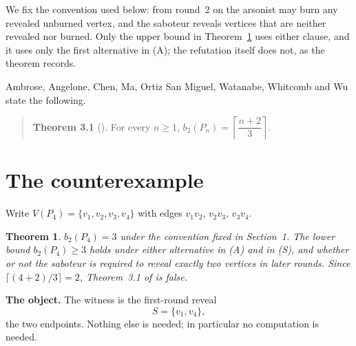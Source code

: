 \documentclass[11pt]{amsart}
\newtheorem{theorem}{Theorem}
\theoremstyle{remark}
\begin{document}
\noindent
We fix the convention used below: from round~$2$ on the arsonist may burn any
revealed unburned vertex, and the saboteur reveals vertices that are neither
revealed nor burned. Only the upper bound in Theorem~\ref{thm:main} uses either
clause, and it uses only the first alternative in (A); the refutation itself
does not, as the theorem records.

Ambrose, Angelone, Chen, Ma, Ortiz San Miguel, Watanabe, Whitcomb and Wu
\cite{Target} state the following.

\begin{quote}
\textbf{Theorem 3.1} (\cite{Target}). For every $n\ge1$,
$b_2(P_n)=\left\lceil \dfrac{n+2}{3}\right\rceil$.
\end{quote}

\section{The counterexample}

Write $V(P_4)=\{v_1,v_2,v_3,v_4\}$ with edges $v_1v_2$, $v_2v_3$, $v_3v_4$.

\begin{theorem}\label{thm:main}
$b_2(P_4)=3$ under the convention fixed in Section~1. The lower bound
$b_2(P_4)\ge3$ holds under either alternative in (A) and in (S), and whether or
not the saboteur is required to reveal exactly two vertices in later rounds.
Since $\lceil(4+2)/3\rceil=2$, Theorem~3.1 of \cite{Target} is false.
\end{theorem}

\medskip
\noindent\textbf{The object.} The witness is the first-round reveal
\[
  S=\{v_1,v_4\},
\]
the two endpoints. Nothing else is needed; in particular no computation is
needed.
\end{document}
